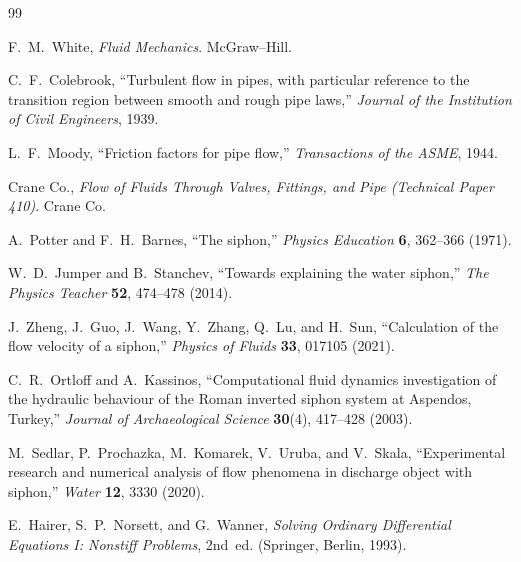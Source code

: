 \documentclass[11pt]{article}
\begin{document}
\begin{thebibliography}{99}

F.~M.~White, \emph{Fluid Mechanics}. McGraw--Hill.

C.~F.~Colebrook, ``Turbulent flow in pipes, with particular reference to the
transition region between smooth and rough pipe laws,'' \emph{Journal of the
Institution of Civil Engineers}, 1939.

L.~F.~Moody, ``Friction factors for pipe flow,'' \emph{Transactions of the
ASME}, 1944.

Crane Co., \emph{Flow of Fluids Through Valves, Fittings, and Pipe (Technical
Paper 410)}. Crane Co.

A.~Potter and F.~H.~Barnes, ``The siphon,'' \emph{Physics Education} \textbf{6},
362--366 (1971).

W.~D.~Jumper and B.~Stanchev, ``Towards explaining the water siphon,'' \emph{The
Physics Teacher} \textbf{52}, 474--478 (2014).

J.~Zheng, J.~Guo, J.~Wang, Y.~Zhang, Q.~Lu, and H.~Sun, ``Calculation of the flow
velocity of a siphon,'' \emph{Physics of Fluids} \textbf{33}, 017105 (2021).

C.~R.~Ortloff and A.~Kassinos, ``Computational fluid dynamics investigation of
the hydraulic behaviour of the Roman inverted siphon system at Aspendos,
Turkey,'' \emph{Journal of Archaeological Science} \textbf{30}(4), 417--428
(2003).

M.~Sedlar, P.~Prochazka, M.~Komarek, V.~Uruba, and V.~Skala, ``Experimental
research and numerical analysis of flow phenomena in discharge object with
siphon,'' \emph{Water} \textbf{12}, 3330 (2020).

E.~Hairer, S.~P.~Norsett, and G.~Wanner, \emph{Solving Ordinary Differential
Equations I: Nonstiff Problems}, 2nd~ed. (Springer, Berlin, 1993).

\end{thebibliography}
\end{document}
